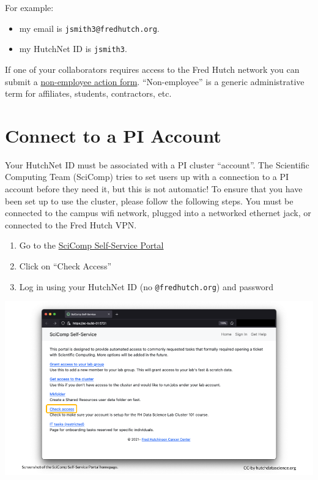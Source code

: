 \documentclass[
]{book}
\providecommand{\tightlist}{%
  \setlength{\itemsep}{0pt}\setlength{\parskip}{0pt}}
\begin{document}
For example:

\begin{itemize}
\tightlist
\item
  my email is \texttt{jsmith3@fredhutch.org}.\\
\item
  my HutchNet ID is \texttt{jsmith3}.
\end{itemize}

If one of your collaborators requires access to the Fred Hutch network you can submit a \href{https://centernet.fredhutch.org/cn/f/hr/lcex/non-employee-action-form.html}{non-employee action form}. ``Non-employee'' is a generic administrative term for affiliates, students, contractors, etc.

\hypertarget{pi-account}{%
\section{Connect to a PI Account}\label{pi-account}}

Your HutchNet ID must be associated with a PI cluster ``account''. The Scientific Computing Team (SciComp) tries to set users up with a connection to a PI account before they need it, but this is not automatic! To ensure that you have been set up to use the cluster, please follow the following steps. You must be connected to the campus wifi network, plugged into a networked ethernet jack, or connected to the Fred Hutch VPN.

\begin{enumerate}
\def\labelenumi{\arabic{enumi}.}
\tightlist
\item
  Go to the \href{https://scicomp-self-service.fredhutch.org/}{SciComp Self-Service Portal}
\item
  Click on ``Check Access''
\item
  Log in using your HutchNet ID (no \texttt{@fredhutch.org}) and password
\end{enumerate}

\includegraphics[width=1\linewidth]{resources/images/02-accounts_files/figure-latex//1BQxrVYdKZTbpCaF-i_q9w7s9x034lEXpQZDU-Sl09cs_g166d4f31b2e_0_0}
\end{document}
